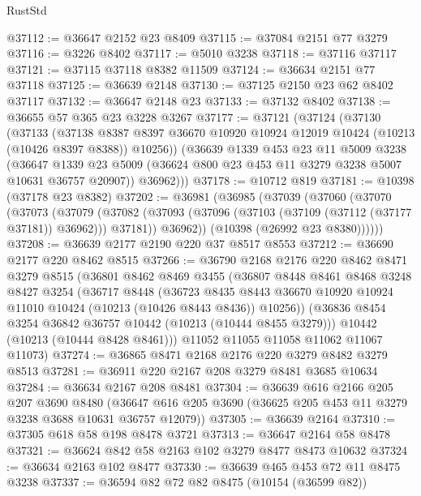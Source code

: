 \begin{lexlean}{RustStd}
\begin{coremodule}
@37112 := @36647 @2152 @23 @8409
@37115 := @37084 @2151 @77 @3279
@37116 := @3226 @8402
@37117 := @5010 @3238
@37118 := @37116 @37117
@37121 := @37115 @37118 @8382 @11509
@37124 := @36634 @2151 @77 @37118
@37125 := @36639 @2148
@37130 := @37125 @2150 @23 @62 @8402 @37117
@37132 := @36647 @2148 @23
@37133 := @37132 @8402
@37138 := @36655 @57 @365 @23 @3228 @3267
@37177 := @37121
    (@37124
      (@37130
        (@37133
          (@37138
            @8387
            @8397
            @36670
            @10920
            @10924
            @12019
            @10424
            (@10213 (@10426 @8397 @8388))
            @10256))
        (@36639
          @1339
          @453
          @23
          @11
          @5009
          @3238
          (@36647 @1339 @23 @5009 (@36624 @800 @23 @453 @11 @3279 @3238 @5007 @10631 @36757 @20907))
          @36962)))
@37178 := @10712 @819
@37181 := @10398 (@37178 @23 @8382)
@37202 := @36981
    (@36985
      (@37039
        (@37060
          (@37070
            (@37073
              (@37079
                (@37082 (@37093 (@37096 (@37103 (@37109 (@37112 (@37177 @37181)) @36962))) @37181))
                @36962))
            (@10398 (@26992 @23 @8380))))))
@37208 := @36639 @2177 @2190 @220 @37 @8517 @8553
@37212 := @36690 @2177 @220 @8462 @8515
@37266 := @36790
    @2168
    @2176
    @220
    @8462
    @8471
    @3279
    @8515
    (@36801
      @8462
      @8469
      @3455
      (@36807
        @8448
        @8461
        @8468
        @3248
        @8427
        @3254
        (@36717
          @8448
          (@36723
            @8435
            @8443
            @36670
            @10920
            @10924
            @11010
            @10424
            (@10213 (@10426 @8443 @8436))
            @10256))
        (@36836 @8454 @3254 @36842 @36757 @10442 (@10213 (@10444 @8455 @3279)))
        @10442
        (@10213 (@10444 @8428 @8461)))
      @11052
      @11055
      @11058
      @11062
      @11067
      @11073)
@37274 := @36865 @8471 @2168 @2176 @220 @3279 @8482 @3279 @8513
@37281 := @36911 @220 @2167 @208 @3279 @8481 @3685 @10634
@37284 := @36634 @2167 @208 @8481
@37304 := @36639
    @616
    @2166
    @205
    @207
    @3690
    @8480
    (@36647 @616 @205 @3690 (@36625 @205 @453 @11 @3279 @3238 @3688 @10631 @36757 @12079))
@37305 := @36639 @2164
@37310 := @37305 @618 @58 @198 @8478 @3721
@37313 := @36647 @2164 @58 @8478
@37321 := @36624 @842 @58 @2163 @102 @3279 @8477 @8473 @10632
@37324 := @36634 @2163 @102 @8477
@37330 := @36639 @465 @453 @72 @11 @8475 @3238
@37337 := @36594 @82 @72 @82 @8475 (@10154 (@36599 @82))

\end{coremodule}
\end{lexlean}
